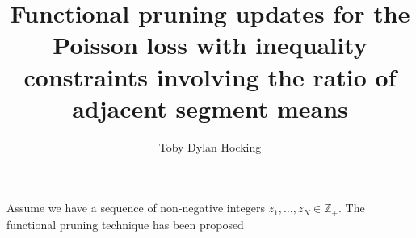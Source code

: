 \documentclass{article}
\begin{document}
\title{Functional pruning updates for the Poisson loss with inequality
  constraints involving the ratio of adjacent segment means}
\author{Toby Dylan Hocking}

Assume we have a sequence of non-negative integers
$z_1,\dots,z_N\in\mathbb Z_+$. The functional pruning technique
\citep{Hocking-constrained-changepoint-detection} has been proposed



\end{document}
